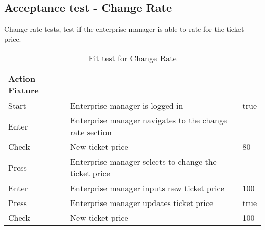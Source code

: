 \subsection{Acceptance test - Change Rate}
Change rate tests, test if the enterprise manager is able to rate for the ticket price.

\begin{table}[H]
    \centering
    \begin{tabular}{| l | l | l |}
        \hline
        \textbf{Action Fixture} &                                                               &       \\\hline
        Start                   & Enterprise manager is logged in                               & true  \\\hline
        Enter                   & Enterprise manager navigates to the change rate section       &       \\\hline
        Check                   & New ticket price                                              & 80    \\\hline
        Press                   & Enterprise manager selects to change the ticket price         &       \\\hline
        Enter                   & Enterprise manager inputs new ticket price                    & 100   \\\hline
        Press                   & Enterprise manager updates ticket price                       & true  \\\hline
        Check                   & New ticket price                                              & 100   \\\hline
    \end{tabular}
    \caption{Fit test for Change Rate}
\end{table}

